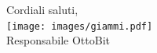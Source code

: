 \documentclass[11pt,a4paper]{article}
\begin{document}
	\hfill
	\begin{minipage}{0.3\textwidth}\raggedleft
	\vspace{4em}
	Cordiali saluti,\\
	\vspace{1em}
	\texttt{[image: images/giammi.pdf]}
	\\Responsabile OttoBit
	
\end{minipage}
\end{document}
